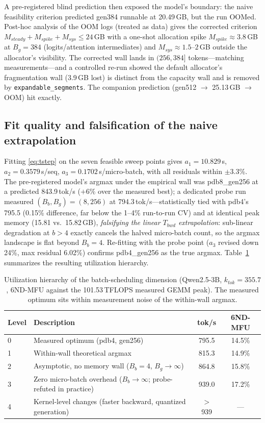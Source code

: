 \documentclass[11pt]{article}
\theoremstyle{definition}
\begin{document}
A pre-registered blind prediction then exposed the model's boundary: the naive
feasibility criterion predicted gen384 runnable at 20.49\,GB, but the run OOMed.
Post-hoc analysis of the OOM logs (treated as data) gives the corrected criterion
$M_{steady}+M_{spike}+M_{sys}\le24$\,GB with a one-shot allocation spike
$M_{spike}\approx3.8$\,GB at $B_g{=}384$ (logits/attention intermediates) and
$M_{sys}\approx1.5$--$2$\,GB outside the allocator's visibility. The corrected
wall lands in $(256,384]$ tokens---matching measurements---and a controlled re-run
showed the default allocator's fragmentation wall (3.9\,GB lost) is distinct from
the capacity wall and is removed by \texttt{expandable\_segments}. The companion
prediction (gen512 $\to$ 25.13\,GB $\to$ OOM) hit exactly.

\subsection{Fit quality and falsification of the naive extrapolation}\label{sec:l1-fit}
Fitting \eqref{eq:tstep} on the seven feasible sweep points gives
$a_1{=}10.829$\,s, $a_2{=}0.3579$\,s/seq, $a_3{=}0.1702$\,s/micro-batch, with all
residuals within $\pm$3.3\%. The pre-registered model's argmax under the empirical
wall was pdb8\_gen256 at a predicted 843.9\,tok/s ($+6\%$ over the measured best);
a dedicated probe run measured $(B_b,B_g){=}(8,256)$ at 794.3\,tok/s---statistically
tied with pdb4's 795.5 (0.15\% difference, far below the 1--4\% run-to-run CV) and
at identical peak memory (15.81 vs.\ 15.82\,GB), \emph{falsifying the linear
$T_{bwd}$ extrapolation}: sub-linear degradation at $b{>}4$ exactly cancels the
halved micro-batch count, so the argmax landscape is flat beyond $B_b{=}4$.
Re-fitting with the probe point ($a_3$ revised down 24\%, max residual 6.02\%)
confirms pdb4\_gen256 as the true argmax. Table~\ref{tab:util} summarizes the
resulting utilization hierarchy.

\begin{table}[t]
\centering\small
\caption{Utilization hierarchy of the batch-scheduling dimension (Qwen2.5-3B,
$k_{tok}{=}355.7$, 6ND-MFU against the 101.53\,TFLOPS measured GEMM peak). The
measured optimum sits within measurement noise of the within-wall argmax.}
\label{tab:util}
\begin{tabular}{@{}llcc@{}}
\toprule
Level & Description & tok/s & 6ND-MFU \\
\midrule
0 & Measured optimum (pdb4, gen256) & 795.5 & 14.5\% \\
1 & Within-wall theoretical argmax & 815.3 & 14.9\% \\
2 & Asymptotic, no memory wall ($B_b{=}4$, $B_g{\to}\infty$) & 864.8 & 15.8\% \\
3 & Zero micro-batch overhead ($B_b{\to}\infty$; probe-refuted in practice) & 939.0 & 17.2\% \\
4 & Kernel-level changes (faster backward, quantized generation) & $>$939 & --- \\
\bottomrule
\end{tabular}
\end{table}
\end{document}

